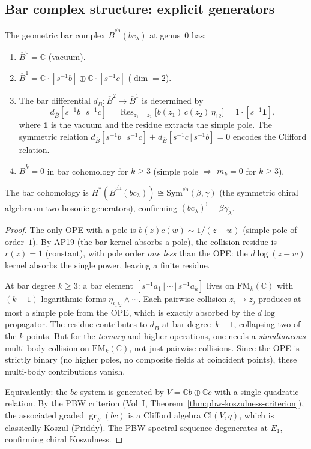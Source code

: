 \documentclass[11pt]{article}
\newcommand{\barB}{\overline{B}}
\newcommand{\C}{\mathbb{C}}
\newcommand{\Res}{\operatorname{Res}}
\newcommand{\FM}{\mathrm{FM}}
\DeclareMathOperator{\gr}{gr}
\begin{document}
\subsection{Bar complex structure: explicit generators}

\begin{proposition}
\label{prop:bar-bc-genus0}
The geometric bar complex $\barB^{\mathrm{ch}}(bc_\lambda)$ at
genus~$0$ has:
\begin{enumerate}
\item $\barB^0 = \C$ (vacuum).
\item $\barB^1 = \C \cdot [s^{-1}b] \oplus \C \cdot [s^{-1}c]$
  ($\dim = 2$).
\item The bar differential $d_{\barB}\colon \barB^2 \to \barB^1$
  is determined by
  \[
  d_{\barB}[s^{-1}b \,|\, s^{-1}c]
  = \Res_{z_1 = z_2}
    \bigl[b(z_1)\,c(z_2)\,\eta_{12}\bigr]
  = 1 \cdot [s^{-1}\mathbf{1}],
  \]
  where $\mathbf{1}$ is the vacuum and the residue extracts the
  simple pole.  The symmetric relation
  $d_{\barB}[s^{-1}b \,|\, s^{-1}c]
  + d_{\barB}[s^{-1}c \,|\, s^{-1}b] = 0$
  encodes the Clifford relation.
\item $\barB^k = 0$ in bar cohomology for $k \ge 3$
  (simple pole $\Rightarrow$ $m_k = 0$ for $k \ge 3$).
\end{enumerate}
The bar cohomology is
$H^*(\barB^{\mathrm{ch}}(bc_\lambda))
\cong \mathrm{Sym}^{\mathrm{ch}}(\beta, \gamma)$
(the symmetric chiral algebra on two bosonic generators),
confirming $(bc_\lambda)^! = \beta\gamma_\lambda$.
\end{proposition}

\begin{proof}
The only OPE with a pole is $b(z)c(w) \sim 1/(z{-}w)$
(simple pole of order~$1$).  By AP19 (the bar kernel absorbs
a pole), the collision residue is $r(z) = 1$ (constant),
with pole order \emph{one less} than the OPE: the
$d\log(z{-}w)$ kernel absorbs the single power, leaving a
finite residue.

At bar degree $k \ge 3$: a bar element
$[s^{-1}a_1 \,|\, \cdots \,|\, s^{-1}a_k]$ lives on
$\FM_k(\C)$ with $(k{-}1)$ logarithmic forms
$\eta_{i_1 i_2} \wedge \cdots$.  Each pairwise collision
$z_i \to z_j$ produces at most a simple pole from the OPE,
which is exactly absorbed by the $d\log$ propagator.  The
residue contributes to $d_{\barB}$ at bar degree~$k{-}1$,
collapsing two of the $k$ points.  But for the \emph{ternary}
and higher operations, one needs a \emph{simultaneous}
multi-body collision on $\FM_k(\C)$, not just pairwise
collisions.  Since the OPE is strictly binary (no higher
poles, no composite fields at coincident points), these
multi-body contributions vanish.

Equivalently: the $bc$ system is generated by $V = \C b
\oplus \C c$ with a single quadratic relation.  By the PBW
criterion (Vol~I, Theorem~\ref*{thm:pbw-koszulness-criterion}),
the associated graded $\gr_F(bc)$ is a Clifford algebra
$\mathrm{Cl}(V, q)$, which is classically Koszul (Priddy).
The PBW spectral sequence degenerates at $E_1$, confirming
chiral Koszulness.
\end{proof}
\end{document}

